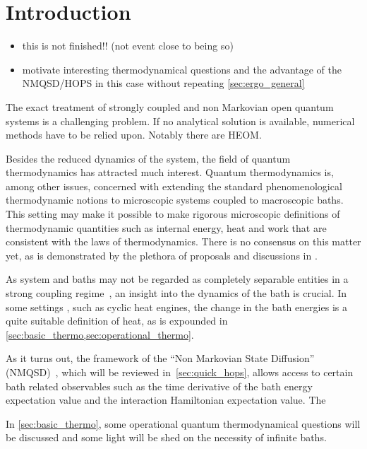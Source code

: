 \chapter{Introduction}
\label{chap:intro}
\begin{itemize}
\item this is not finished!! (not event close to being so)
\item motivate interesting thermodynamical questions and the advantage
  of the NMQSD/HOPS in this case without repeating \cref{sec:ergo_general}
\end{itemize}

The exact treatment of strongly coupled and non Markovian open quantum
systems is a challenging problem.  If no analytical solution is
available, numerical methods have to be relied upon. Notably there are
HEOM.

Besides the reduced dynamics of the system, the field of quantum
thermodynamics has attracted much interest. Quantum thermodynamics is,
among other issues, concerned with extending the standard
phenomenological thermodynamic notions to microscopic systems coupled
to macroscopic baths. This setting may make it possible to make
rigorous microscopic definitions of thermodynamic quantities such as
internal energy, heat and work that are consistent with the laws of
thermodynamics. There is no consensus on this matter yet, as is
demonstrated by the plethora of proposals and discussions in
\cite{Rivas2019Oct,Talkner2020Oct,Motz2018Nov,Wiedmann2020Mar,Senior2020Feb,Kato2015Aug,Kato2016Dec,Strasberg2021Aug,Talkner2016Aug,Bera2021Feb,Bera2021Jun,Esposito2015Dec}.

As system and baths may not be regarded as completely separable
entities in a strong coupling
regime~\cite{Rivas2019Oct,Esposito2015Dec}, an insight into the
dynamics of the bath is crucial. In some settings
\cite{Kato2016Dec,Lobejko2021Feb, Strasberg2021Aug}, such as cyclic
heat engines, the change in the bath energies is a quite suitable
definition of heat, as is expounded in
\cref{sec:basic_thermo,sec:operational_thermo}.

As it turns out, the framework of the ``Non Markovian State
Diffusion'' (NMQSD)~\cite{Diosi1998Mar}, which will be reviewed
in~\cref{sec:quick_hops}, allows access to certain bath related
observables such as the time derivative of the bath energy expectation
value and the interaction Hamiltonian expectation value. The

In \cref{sec:basic_thermo}, some operational quantum thermodynamical
questions will be discussed and some light will be shed on the
necessity of infinite baths.

